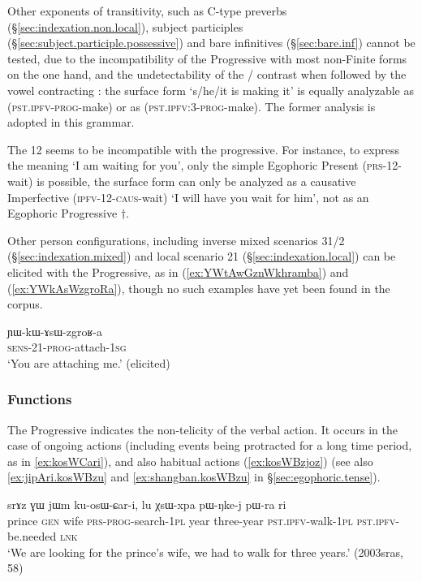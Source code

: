 Other exponents of transitivity, such as C-type preverbs (§\ref{sec:indexation.non.local}), subject participles (§\ref{sec:subject.participle.possessive}) and bare infinitives (§\ref{sec:bare.inf}) cannot be tested, due to the incompatibility of the Progressive with most non-Finite forms on the one hand, and the undetectability of the / contrast when followed by the vowel contracting : the surface form  `s/he/it is making it' is equally analyzable as  (\textsc{pst}.\textsc{ipfv}-\textsc{prog}-make) or as  (\textsc{pst}.\textsc{ipfv}:3\flobv{}-\textsc{prog}-make). The former analysis is adopted in this grammar.

The 1\fl{}2  seems to be incompatible with the progressive. For instance, to express the meaning `I am waiting for you', only the simple Egophoric Present  (\textsc{prs}-1\fl{}2-wait) is possible, the surface form  can only be analyzed as a causative Imperfective  (\textsc{ipfv}-1\fl{}2-\textsc{caus}-wait) `I will have you wait for him', not as an Egophoric Progressive $\dagger$.

Other person configurations, including inverse mixed scenarios 3\fl{}1/2 (§\ref{sec:indexation.mixed}) and local scenario 2\fl{}1 (§\ref{sec:indexation.local}) can be elicited with the Progressive, as in (\ref{ex:YWtAwGznWkhramba}) and (\ref{ex:YWkAsWzgroRa}), though no such examples have yet been found in the corpus.

\begin{exe}
\ex \label{ex:YWkAsWzgroRa}
\gll ɲɯ-kɯ-ɤsɯ-zgroʁ-a \\
\textsc{sens}-2\fl{}1-\textsc{prog}-attach-\textsc{1sg} \\
\glt `You are attaching me.' (elicited)
 \end{exe}
 
\subsubsection{Functions} \label{sec:progressive.function}
The Progressive indicates the non-telicity of the verbal action. It occurs in the case of ongoing actions (including events being protracted for a long time period, as in \ref{ex:kosWCari}), and also habitual actions (\ref{ex:kosWBzjoz}) (see also \ref{ex:jipAri.kosWBzu} and \ref{ex:shangban.kosWBzu} in §\ref{sec:egophoric.tense}).

\begin{exe}
\ex \label{ex:kosWCari}
\gll srɤz ɣɯ jɯm ku-osɯ-ɕar-i, lu χsɯ-xpa pɯ-ŋke-j pɯ-ra ri  \\
prince \textsc{gen} wife \textsc{prs}-\textsc{prog}-search-\textsc{1pl} year three-year \textsc{pst}.\textsc{ipfv}-walk-\textsc{1pl} \textsc{pst}.\textsc{ipfv}-be.needed \textsc{lnk} \\
\glt `We are looking for the prince's wife, we had to walk for three years.'  (2003sras, 58)
 \end{exe}
 
